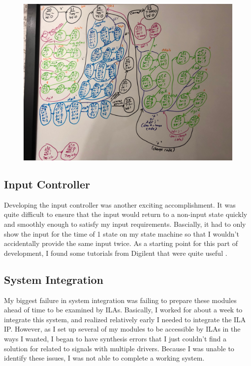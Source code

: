 \documentclass[11pt]{article}
\begin{document}
\begin{figure}[H]
\begin{center}
	\includegraphics[width=\textwidth]{./img/detailstatemachine.jpg}
	\caption{\label{fig:detstatemachine}}
\end{center}
\end{figure}



\subsection{Input Controller}

Developing the input controller was another exciting accomplishment. It was quite difficult to ensure that the input would return to a non-input state quickly and smoothly enough to satisfy my input requirements. Bascially, it had to only show the input for the time of 1 state on my state machine so that I wouldn't accidentally provide the same input twice. As a starting point for this part of development, I found some tutorials from Digilent that were quite useful \cite{ps2}.

\subsection{System Integration}

My biggest failure in system integration was failing to prepare these modules ahead of time to be examined by ILAs. Basically, I worked for about a week to integrate this system, and realized relatively early I needed to integrate the ILA IP. However, as I set up several of my modules to be accessible by ILAs in the ways I wanted, I began to have synthesis errors that I just couldn't find a solution for related to signals with multiple drivers. Because I was unable to identify these issues, I was not able to complete a working system.
\end{document}
